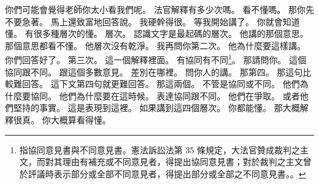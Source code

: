 \hypertarget{c01:cue:139}{}你們可能會覺得老師你太小看我們呢。
\hypertarget{c01:cue:140}{}法官解釋有多少次嗎。
\hypertarget{c01:cue:141}{}看不懂嗎。
\hypertarget{c01:cue:142}{}那你先不要急著。
\hypertarget{c01:cue:143}{}馬上還致富地回答說。
\hypertarget{c01:cue:144}{}我硬幹得很。
\hypertarget{c01:cue:145}{}等我開始講了。
\hypertarget{c01:cue:146}{}你就會知道懂。
\hypertarget{c01:cue:147}{}有很多種層次的懂。
\hypertarget{c01:cue:148}{}層次。
\hypertarget{c01:cue:149}{}認識文字是最起碼的層次。
\hypertarget{c01:cue:150}{}他講的那個意思。
\hypertarget{c01:cue:151}{}那個意思都看不懂。
\hypertarget{c01:cue:152}{}他層次沒有乾淨。
\hypertarget{c01:cue:153}{}我再問你第二次。
\hypertarget{c01:cue:154}{}他為什麼要這樣講。
\hypertarget{c01:cue:155}{}你們回答好了。
\hypertarget{c01:cue:156}{}第三次。
\hypertarget{c01:cue:157}{}這一個解釋裡面。
\hypertarget{c01:cue:158}{}有協同有不同\footnote{指協同意見書與不同意見書。憲法訴訟法第 35 條規定，大法官贊成裁判之主文，而對其理由有補充或不同意見者，得提出協同意見書；對於裁判之主文曾於評議時表示部分或全部不同意見者，得提出部分或全部之不同意見書。\cite{csfa}。}。
\hypertarget{c01:cue:159}{}那請問你。
\hypertarget{c01:cue:160}{}這個協同跟不同。
\hypertarget{c01:cue:161}{}跟這個多數意見。
\hypertarget{c01:cue:162}{}差別在哪裡。
\hypertarget{c01:cue:163}{}問你人的講。
\hypertarget{c01:cue:164}{}那第四。
\hypertarget{c01:cue:165}{}那這句比較難回答。
\hypertarget{c01:cue:166}{}這下文第四句就更難回答。
\hypertarget{c01:cue:167}{}那這兩個。
\hypertarget{c01:cue:168}{}不管是協同或不同。
\hypertarget{c01:cue:169}{}他們為什麼要協同。
\hypertarget{c01:cue:170}{}他們為什麼要在這時候。
\hypertarget{c01:cue:171}{}表達協同跟不同。
\hypertarget{c01:cue:172}{}他們在爭取。
\hypertarget{c01:cue:173}{}或者他們堅持的事實。
\hypertarget{c01:cue:174}{}這是表現到這裡。
\hypertarget{c01:cue:175}{}如果講到這四個層次。
\hypertarget{c01:cue:176}{}你都能懂。
\hypertarget{c01:cue:177}{}那大概解釋很真。
\hypertarget{c01:cue:178}{}你大概算看得懂。

